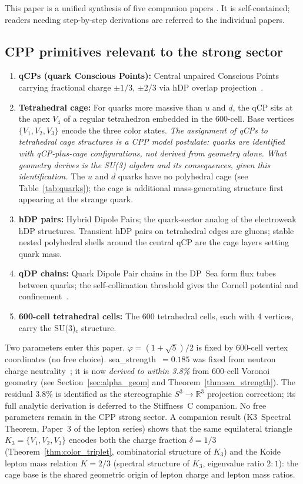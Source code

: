 \documentclass[11pt,letterpaper]{article}
\newcommand{\phig}{\varphi}
\begin{document}
This paper is a unified synthesis of five companion papers
\citep{cpp_ss1,cpp_ss2,cpp_ss3,cpp_ss4,cpp_ss5}.  It is
self-contained; readers needing step-by-step derivations are
referred to the individual papers.

\subsection{CPP primitives relevant to the strong sector}

\begin{enumerate}
\item \textbf{qCPs (quark Conscious Points):} Central unpaired
  Conscious Points carrying fractional charge $\pm 1/3$, $\pm 2/3$
  via hDP overlap projection~\citep{cpp5014}.
\item \textbf{Tetrahedral cage:} For quarks more massive than $u$ and $d$,
  the qCP sits at the apex $V_4$ of a regular tetrahedron embedded in
  the 600-cell.  Base vertices $\{V_1, V_2, V_3\}$ encode the three
  color states.  \textit{The assignment of qCPs to tetrahedral cage
  structures is a CPP model postulate: quarks are identified with
  qCP-plus-cage configurations, not derived from geometry alone.
  What geometry derives is the SU(3) algebra and its consequences,
  given this identification.}  The $u$ and $d$ quarks have no
  polyhedral cage (see Table~\ref{tab:quarks}); the cage is additional
  mass-generating structure first appearing at the strange quark.
\item \textbf{hDP pairs:} Hybrid Dipole Pairs; the quark-sector
  analog of the electroweak hDP structures.  Transient hDP pairs
  on tetrahedral edges are gluons; stable nested polyhedral shells
  around the central qCP are the cage layers setting quark mass.
\item \textbf{qDP chains:} Quark Dipole Pair chains in the DP~Sea
  form flux tubes between quarks; the self-collimation threshold
  gives the Cornell potential and confinement~\citep{c14}.
\item \textbf{600-cell tetrahedral cells:} The 600 tetrahedral
  cells, each with 4 vertices, carry the SU(3)$_c$ structure.
\end{enumerate}

Two parameters enter this paper.  $\phig = (1+\sqrt5)/2$ is fixed by
600-cell vertex coordinates (no free choice).  sea\_strength~$= 0.185$
was fixed from neutron charge neutrality~\citep{cpp5014}; it is now
\emph{derived to within 3.8\%} from 600-cell Voronoi geometry (see
Section~\ref{sec:alpha_geom} and Theorem~\ref{thm:sea_strength}).
The residual 3.8\% is identified as the stereographic $S^3\to\mathbb{R}^3$
projection correction; its full analytic derivation is deferred to
the Stiffness~C companion.
No free parameters remain in the CPP strong sector.
A companion result (K3~Spectral Theorem, Paper~3 of the lepton series)
shows that the same equilateral triangle $K_3 = \{V_1,V_2,V_3\}$
encodes both the charge fraction $\delta = 1/3$ (Theorem~\ref{thm:color_triplet},
combinatorial structure of $K_3$) and the Koide lepton mass relation
$K = 2/3$ (spectral structure of $K_3$, eigenvalue ratio $2{:}1$):
the cage base is the shared geometric origin of lepton charge and
lepton mass ratios.
\end{document}

